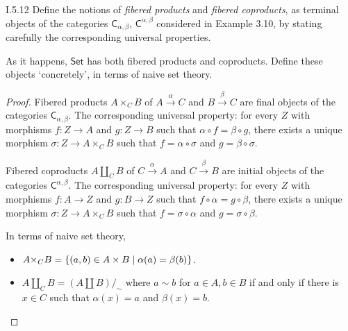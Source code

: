 \begin{exercise}{I.5.12}
	Define the notions of \textit{fibered products} and \textit{fibered coproducts}, as terminal objects of the categories ${\mathsf{C}}_{\alpha,\beta}$, ${\mathsf{C}}^{\alpha,\beta}$ considered in Example 3.10, by stating carefully the corresponding universal properties.

	As it happens, $\mathsf{Set}$ has both fibered products and coproducts. Define these objects `concretely', in terms of naive set theory.
\end{exercise}

\begin{proof}
	Fibered products $A{\times_{C}}B$ of $A \stackrel{\alpha}{\rightarrow} C$ and $B\stackrel{\beta}{\rightarrow} C$ are final objects of the categories ${\mathsf{C}}_{\alpha,\beta}$. The corresponding universal property: for every $Z$ with morphisms $f: Z\to A$ and $g: Z\to B$ such that $\alpha\circ f = \beta\circ g$, there exists a unique morphism $\sigma: Z\to A{\times_{C}}B$ such that $f = \alpha\circ\sigma$ and $g = \beta\circ\sigma$.

	Fibered coproducts $A{\coprod_{C}}B$ of $C \stackrel{\alpha}{\rightarrow} A$ and $C \stackrel{\beta}{\rightarrow} B$ are initial objects of the categories ${\mathsf{C}}^{\alpha,\beta}$. The corresponding universal property: for every $Z$ with morphisms $f: A\to Z$ and $g: B\to Z$ such that $f\circ\alpha = g\circ\beta$, there exists a unique morphism $\sigma: Z\to A{\times_{C}}B$ such that $f = \sigma\circ\alpha$ and $g = \sigma\circ\beta$.

	In terms of naive set theory,
	\begin{itemize}
		\item $A{\times_{C}}B = \left\{{\left({a, b}\right) \in A\times B \mid \alpha(a) = \beta(b)}\right\}$.
		\item $A\coprod_{C}B = (A\coprod B)/_{\sim}$ where $a\sim b$ for $a\in A, b\in B$ if and only if there is $x\in C$ such that $\alpha(x) = a$ and $\beta(x) = b$.
	\end{itemize}
\end{proof}
